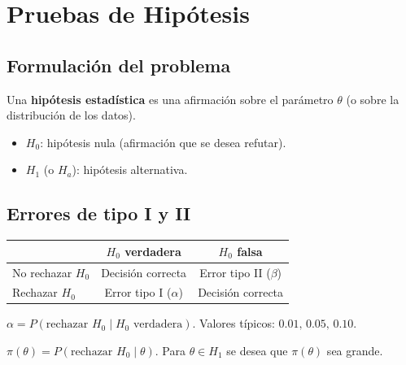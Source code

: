 \section{Pruebas de Hipótesis}

\subsection{Formulación del problema}

\begin{defi}
  Una \textbf{hipótesis estadística} es una afirmación sobre el parámetro
  $\theta$ (o sobre la distribución de los datos).
  \begin{itemize}
    \item $H_0$: hipótesis nula (afirmación que se desea refutar).
    \item $H_1$ (o $H_a$): hipótesis alternativa.
  \end{itemize}
\end{defi}

\subsection{Errores de tipo I y II}

\begin{center}
\begin{tabular}{lcc}
  \toprule
  & $H_0$ verdadera & $H_0$ falsa \\
  \midrule
  No rechazar $H_0$ & Decisión correcta & Error tipo II ($\beta$) \\
  Rechazar $H_0$    & Error tipo I ($\alpha$) & Decisión correcta \\
  \bottomrule
\end{tabular}
\end{center}

\begin{defi}
  $\alpha = P(\text{rechazar } H_0 \mid H_0 \text{ verdadera})$.
  Valores típicos: $0.01,\, 0.05,\, 0.10$.
\end{defi}

\begin{defi}[Potencia]
  $\pi(\theta) = P(\text{rechazar } H_0 \mid \theta)$.
  Para $\theta \in H_1$ se desea que $\pi(\theta)$ sea grande.
\end{defi}

